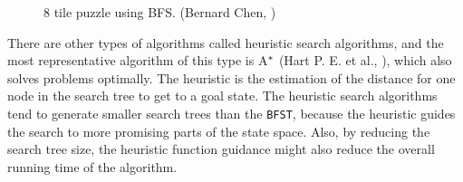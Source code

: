 \iftrue
\begin{landscape}
\begin{figure}[htb]

\resizebox{\dimexpr\linewidth-1cm}{!}{%
\begin{forest}
[\usebox\myboxbfsone
  [\usebox\myboxbfstwo
	[\usebox\myboxbfsfive
		[\usebox\myboxbfsten
			[\usebox\myboxbfstwenty
				[\usebox\myboxbfsthirtyfour]
				[\usebox\myboxbfsthirtyfive]			
			]		
		]
		[\usebox\myboxbfseleven
			[\usebox\myboxbfstwentyone
				[\usebox\myboxbfsthirtysix]
				[\usebox\myboxbfsthirtyseven]			
			]
			[\usebox\myboxbfstwentytwo
				[\usebox\myboxbfsthirtyeight]
				[\usebox\myboxbfsthirtynine]			
			]
			[\usebox\myboxbfstwentythree
				[\usebox\myboxbfsforty]
				[\usebox\myboxbfsfortyone]			
			]		
		]	
	]  
  ]
  [\usebox\myboxbfsthree
	[\usebox\myboxbfssix
		[\usebox\myboxbfstwelve
			[\usebox\myboxbfstwentyfour
				[\usebox\myboxbfsfortytwo]
				[\usebox\myboxbfsfortythree]			
			]		
		]
		[\usebox\myboxbfsthirteen
			[\usebox\myboxbfstwentyfive
				[\usebox\myboxbfsfortyfour]
				[\usebox\myboxbfsfortyfive]			
			]		
		]	
	]
	[\usebox\myboxbfsseven
		[\usebox\myboxbfsfourteen
			[\usebox\myboxbfstwentysix
				[\usebox\myboxbfsfortysix]			
			]		
		]
		[\usebox\myboxbfsfifteen
			[\usebox\myboxbfstwentyseven]		
		]	
	]
	[\usebox\myboxbfseight
		[\usebox\myboxbfssixteen
			[\usebox\myboxbfstwentyeight]		
		]
		[\usebox\myboxbfsseventeen
			[\usebox\myboxbfstwentynine]		
		]	
	]  
  ]
  [\usebox\myboxbfsfour
	[\usebox\myboxbfsnine
		[\usebox\myboxbfseighteen
			[\usebox\myboxbfsthirty]
			[\usebox\myboxbfsthirtyone]
			[\usebox\myboxbfsthirtytwo]
		]
		[\usebox\myboxbfsnineteen
			[\usebox\myboxbfsthirtythree]		
		]
	]  
  ]
]
\end{forest}
}
\caption{8 tile puzzle using BFS. (Bernard Chen, \citeyear{bernard2011})} \label{fig:bfs_solution}
\end{figure}
\end{landscape}
\fi

There are other types of algorithms called heuristic search algorithms, and the most representative algorithm of this type is A$\sp{*}$ (Hart P. E. et al., \citeyear{hart1968formal}), which also solves problems optimally. The heuristic is the estimation of the distance for one node in the search tree to get to a goal state. The heuristic search algorithms tend to generate smaller search trees than the \texttt{BFST}, because the heuristic guides the search to more promising parts of the state space. Also, by reducing the search tree size, the heuristic function guidance might also reduce the overall running time of the algorithm.

